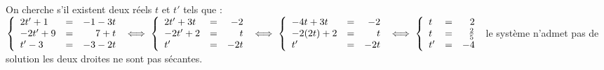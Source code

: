 \documentclass[12pt]{cornouaille}
\begin{document}
\begin{exercice}
\begin{enumerate}
\begin{enumerate}
\begin{solution}
On cherche s'il existent deux réels $t$ et $t'$ tels que :\\
$\left\{\begin{array}{l c r}
2t'+1 &=& -1-3t\\
-2t'+9 &= &7+t\\ 
t'-3 &=&-3-2t
 \end{array}\right. \iff \left\{\begin{array}{l c r}
2t'+3t &=& -2\\
-2t'+2 &= &t\\ 
t' &=&-2t
 \end{array}\right.\iff \left\{\begin{array}{l c r}
-4t+3t &=& -2\\
-2(2t)+2 &= &t\\ 
t' &=&-2t
 \end{array}\right.\iff \left\{\begin{array}{l c r}
t &=& 2\\
t &= &\frac{2}{5}\\ 
t' &=&-4
 \end{array}\right.$
le système n'admet pas de solution les deux droites ne sont pas sécantes.
\end{solution}
	
\end{enumerate}
\end{enumerate}
	
\end{exercice}

\newpage
\end{document}
